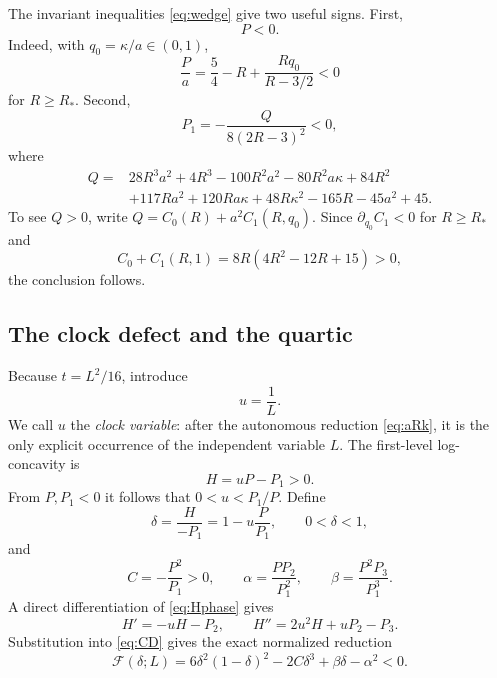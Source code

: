 \documentclass{amsart}
\numberwithin{equation}{section}
\theoremstyle{definition}
\theoremstyle{remark}
\newcommand{\Rstar}{R_*}
\newcommand{\Fcal}{\mathcal F}
\begin{document}
The invariant inequalities \eqref{eq:wedge} give two useful signs.  First,
\begin{equation}\label{eq:Pneg}
 P<0.
\end{equation}
Indeed, with $q_0=\kappa/a\in(0,1)$,
\[
 \frac Pa=\frac54-R+\frac{Rq_0}{R-3/2}<0
\]
for $R\ge\Rstar$.  Second,
\begin{equation}\label{eq:P1neg}
 P_1=-\frac{Q}{8(2R-3)^2}<0,
\end{equation}
where
\begin{align}\label{eq:Q}
Q={}&28R^3a^2+4R^3-100R^2a^2-80R^2a\kappa+84R^2\nonumber\\
&+117Ra^2+120Ra\kappa+48R\kappa^2-165R-45a^2+45.
\end{align}
To see $Q>0$, write $Q=C_0(R)+a^2C_1(R,q_0)$.  Since $\partial_{q_0}C_1<0$ for $R\ge\Rstar$ and
\[
 C_0+C_1(R,1)=8R(4R^2-12R+15)>0,
\]
the conclusion follows.

\subsection{The clock defect and the quartic}
Because $t=L^2/16$, introduce
\begin{equation}\label{eq:uphase}
 u=\frac1L.
\end{equation}
We call $u$ the \emph{clock variable}: after the autonomous reduction \eqref{eq:aRk}, it is the only explicit occurrence of the independent variable $L$.
The first-level log-concavity is
\begin{equation}\label{eq:Hphase}
 H=uP-P_1>0.
\end{equation}
From $P,P_1<0$ it follows that $0<u<P_1/P$.  Define
\begin{equation}\label{eq:delta}
 \delta=\frac{H}{-P_1}=1-u\frac{P}{P_1},
 \qquad0<\delta<1,
\end{equation}
and
\begin{equation}\label{eq:Cab}
 C=-\frac{P^2}{P_1}>0,\qquad
 \alpha=\frac{PP_2}{P_1^2},\qquad
 \beta=\frac{P^2P_3}{P_1^3}.
\end{equation}
A direct differentiation of \eqref{eq:Hphase} gives
\[
 H'=-uH-P_2,\qquad H''=2u^2H+uP_2-P_3.
\]
Substitution into \eqref{eq:CD} gives the exact normalized reduction
\begin{equation}\label{eq:Fquartic}
 \boxed{\quad
 \Fcal(\delta;L)
 =6\delta^2(1-\delta)^2-2C\delta^3+\beta\delta-\alpha^2<0.
 \quad}
\end{equation}
\end{document}
